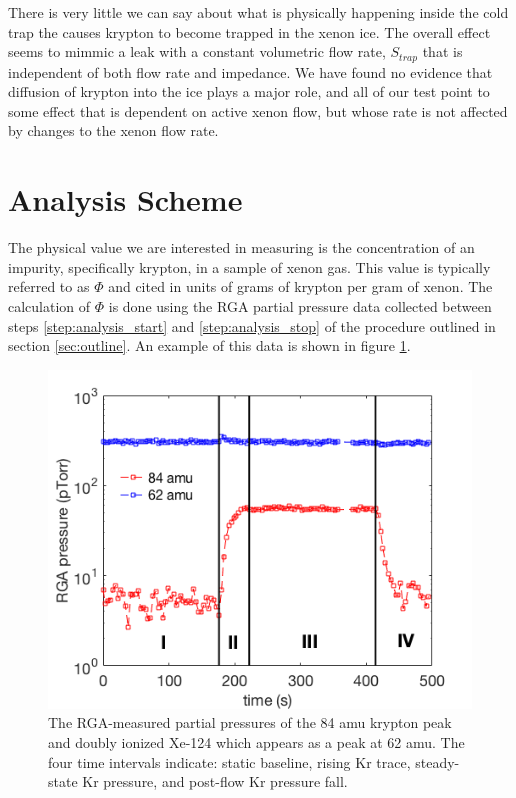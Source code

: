 There is very little we can say about what is physically happening inside the cold trap the causes krypton to become trapped in the xenon ice. The overall effect seems to mimmic a leak with a constant volumetric flow rate, $S_{trap}$ that is independent of both flow rate and impedance. We have found no evidence that diffusion of krypton into the ice plays a major role, and all of our test point to some effect that is dependent on active xenon flow, but whose rate is not affected by changes to the xenon flow rate.

\section{Analysis Scheme}
The physical value we are interested in measuring is the concentration of an impurity, specifically krypton, in a sample of xenon gas. This value is typically referred to as $\Phi$ and cited in units of grams of krypton per gram of xenon. The calculation of $\Phi$ is done using the RGA partial pressure data collected between steps \ref{step:analysis_start} and \ref{step:analysis_stop} of the procedure outlined in section \ref{sec:outline}. An example of this data is shown in figure \ref{fig:RGAtrace}. 

\begin{figure}[h!]
  \includegraphics[width=\linewidth]{Figures/RGA_trace.png}
  \caption{The RGA-measured partial pressures of the 84 amu krypton peak and doubly ionized Xe-124 which appears as a peak at 62 amu. The four time intervals indicate: static baseline, rising Kr trace, steady-state Kr pressure, and post-flow Kr pressure fall.}
  \label{fig:RGAtrace}
\end{figure}


